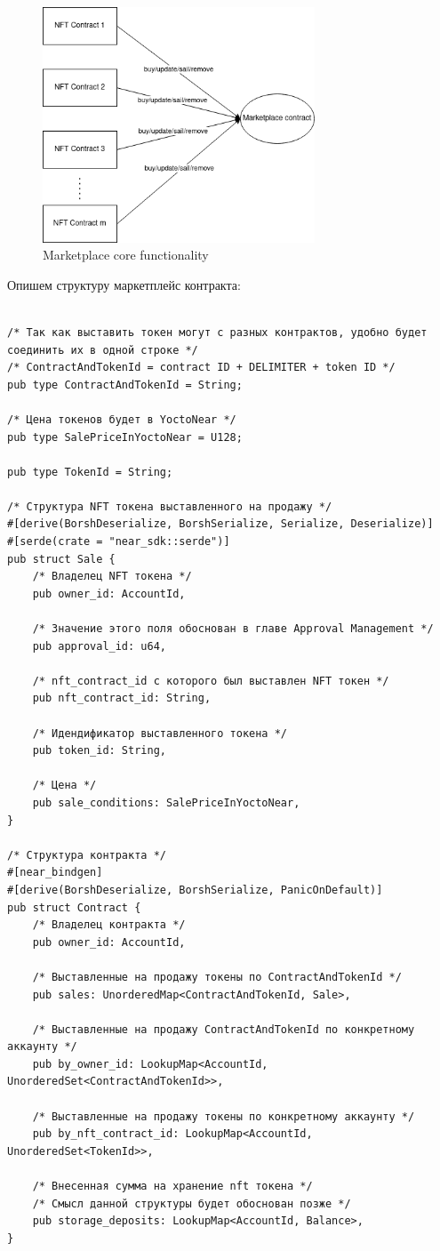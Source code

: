 \begin{figure}[h!]
	\centering
	\includegraphics[height=70mm]{fig/marketplace.png}
	\caption{Marketplace core functionality}
\end{figure}

Опишем структуру маркетплейс контракта:

\begin{verbatim}

/* Так как выставить токен могут с разных контрактов, удобно будет соединить их в одной строке */
/* ContractAndTokenId = contract ID + DELIMITER + token ID */
pub type ContractAndTokenId = String;

/* Цена токенов будет в YoctoNear */
pub type SalePriceInYoctoNear = U128;

pub type TokenId = String;

/* Структура NFT токена выставленного на продажу */
#[derive(BorshDeserialize, BorshSerialize, Serialize, Deserialize)]
#[serde(crate = "near_sdk::serde")]
pub struct Sale {
    /* Владелец NFT токена */
    pub owner_id: AccountId,

    /* Значение этого поля обоснован в главе Approval Management */
    pub approval_id: u64,

    /* nft_contract_id с которого был выставлен NFT токен */
    pub nft_contract_id: String,

    /* Идендификатор выставленного токена */
    pub token_id: String,

    /* Цена */
    pub sale_conditions: SalePriceInYoctoNear,
}

/* Структура контракта */
#[near_bindgen]
#[derive(BorshDeserialize, BorshSerialize, PanicOnDefault)]
pub struct Contract {
    /* Владелец контракта */
    pub owner_id: AccountId,

    /* Выставленные на продажу токены по ContractAndTokenId */
    pub sales: UnorderedMap<ContractAndTokenId, Sale>,

    /* Выставленные на продажу ContractAndTokenId по конкретному аккаунту */
    pub by_owner_id: LookupMap<AccountId, UnorderedSet<ContractAndTokenId>>,

    /* Выставленные на продажу токены по конкретному аккаунту */
    pub by_nft_contract_id: LookupMap<AccountId, UnorderedSet<TokenId>>,

    /* Внесенная сумма на хранение nft токена */
    /* Смысл данной структуры будет обоснован позже */
    pub storage_deposits: LookupMap<AccountId, Balance>,
}
\end{verbatim}

